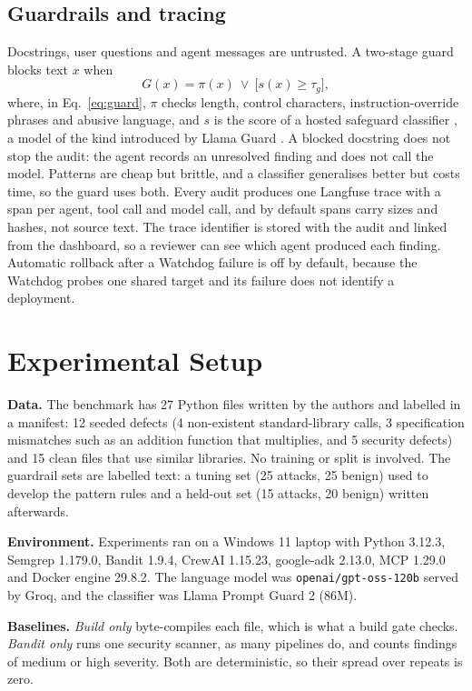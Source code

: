 \documentclass[12pt,onecolumn,draftclsnofoot]{IEEEtran}
\begin{document}
\subsection{Guardrails and tracing}
Docstrings, user questions and agent messages are untrusted. A two-stage guard blocks text $x$ when
\begin{equation}
 G(x)=\pi(x)\ \lor\ \bigl[s(x)\ge\tau_g\bigr],
 \label{eq:guard}
\end{equation}
where, in Eq.~\eqref{eq:guard}, $\pi$ checks length, control characters, instruction-override phrases and abusive language, and $s$ is the score of a hosted safeguard classifier \cite{promptguard}, a model of the kind introduced by Llama Guard \cite{inan2023}. A blocked docstring does not stop the audit: the agent records an unresolved finding and does not call the model. Patterns are cheap but brittle, and a classifier generalises better but costs time, so the guard uses both. Every audit produces one Langfuse trace with a span per agent, tool call and model call, and by default spans carry sizes and hashes, not source text. The trace identifier is stored with the audit and linked from the dashboard, so a reviewer can see which agent produced each finding. Automatic rollback after a Watchdog failure is off by default, because the Watchdog probes one shared target and its failure does not identify a deployment.

\section{Experimental Setup}
\textbf{Data.} The benchmark has 27 Python files written by the authors and labelled in a manifest: 12 seeded defects (4 non-existent standard-library calls, 3 specification mismatches such as an addition function that multiplies, and 5 security defects) and 15 clean files that use similar libraries. No training or split is involved. The guardrail sets are labelled text: a tuning set (25 attacks, 25 benign) used to develop the pattern rules and a held-out set (15 attacks, 20 benign) written afterwards.

\textbf{Environment.} Experiments ran on a Windows 11 laptop with Python 3.12.3, Semgrep 1.179.0, Bandit 1.9.4, CrewAI 1.15.23, google-adk 2.13.0, MCP 1.29.0 and Docker engine 29.8.2. The language model was \texttt{openai/gpt-oss-120b} served by Groq, and the classifier was Llama Prompt Guard 2 (86M).

\textbf{Baselines.} \emph{Build only} byte-compiles each file, which is what a build gate checks. \emph{Bandit only} runs one security scanner, as many pipelines do, and counts findings of medium or high severity. Both are deterministic, so their spread over repeats is zero.
\end{document}
